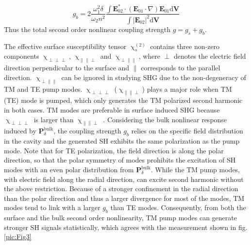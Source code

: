 \documentclass[a4paper,8pt,hyperref, twocolumn]{article}
\begin{document}
\begin{equation}
g_b =  2\frac{\omega_1^2\delta}{\omega_2n^2}\frac{\int \mathbf{E}_{02}^* \cdot (\mathbf{E}_{01}\cdot\nabla)\mathbf{E}_{01} \mathrm{d}	\mathbf{V}}{\int |\mathbf{E}_{02}|^2 \mathrm{d} \mathbf{V}}
\label{eq:gb}
\end{equation}
Thus the total second order nonlinear coupling strength $g = g_s+g_b$. 

The effective surface susceptibility tensor $\upchi^{(2)}_s$ contains three non-zero components $\upchi_{\perp \perp \perp}$, $\upchi_{\parallel \parallel \perp}$ and $\upchi_{\perp \parallel \parallel}$, where $\perp$ denotes the electric field direction perpendicular to the surface and $\parallel$ corresponds to the parallel direction. 
$\upchi_{\perp \parallel \parallel}$ can be ignored in studying SHG due to the non-degeneracy of TM and TE pump modes.  
$\upchi_{\perp \perp \perp}$ ($\upchi_{\parallel \parallel \perp}$) plays a major role when TM (TE) mode is pumped, which only generates the TM polarized second harmonic in both cases. 
TM modes are preferable in surface induced SHG because $\upchi_{\perp \perp \perp}$ is larger than $\upchi_{\parallel \parallel \perp}$ \cite{rodriguez2008calibration}. 
Considering the bulk nonlinear response induced by $\mathbf{P}^{\mathrm{bulk}}_\delta$, the coupling strength $g_b$ relies on the specific field distribution in the cavity and the generated SH exhibits the same polarization as the pump mode. 
Note that for TE polarization, the field direction is along the polar direction, so that the polar symmetry of modes prohibits the excitation of SH modes with an even polar distribution from $\mathbf{P}^{\mathrm{bulk}}_\delta$. 
While the TM pump modes, with electric field along the radial direction, can excite second harmonic without the above restriction.
Because of a stronger confinement in the radial direction than the polar direction and thus a larger divergence for most of the modes, TM modes tend to link with a larger $g_b$ than TE modes. 
Consequently, from both the surface and the bulk second order nonlinearity, TM pump modes can generate stronger SH signals statistically, which agrees with the measurement shown in fig. \ref{pic:Fig3}
\end{document}
